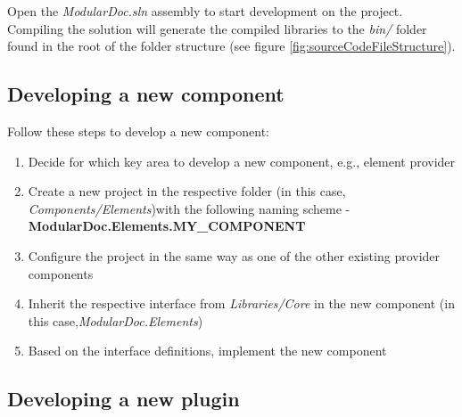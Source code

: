 Open the \textit{ModularDoc.sln} assembly to start development on the project.
Compiling the solution will generate the compiled libraries to the \textit{bin/} folder found in the root of the folder structure (see figure \ref{fig:sourceCodeFileStructure}).

\subsection{Developing a new component}

Follow these steps to develop a new component:
\begin{enumerate}
    \item Decide for which key area to develop a new component, e.g., element provider
    \item Create a new project in the respective folder (in this case, \textit{Components/Elements})\linebreak with the following naming scheme - \textbf{ModularDoc.Elements.MY\_COMPONENT}
    \item Configure the project in the same way as one of the other existing provider components
    \item Inherit the respective interface from \textit{Libraries/Core} in the new component (in this case,\linebreak \textit{ModularDoc.Elements})
    \item Based on the interface definitions, implement the new component
\end{enumerate}

\pagebreak
\subsection{Developing a new plugin}

